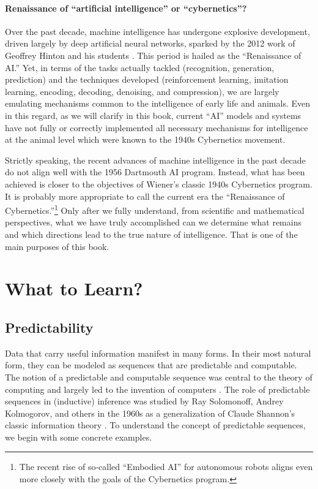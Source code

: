 \documentclass[../../book-main.tex]{subfiles}
\begin{document}
\paragraph{Renaissance of ``artificial intelligence'' or ``cybernetics''?}
Over the past decade, machine intelligence has undergone explosive development, driven largely by deep artificial neural networks, sparked by the 2012 work of Geoffrey Hinton and his students \cite{krizhevsky2012imagenet}. This period is hailed as the ``Renaissance of AI.'' Yet, in terms of the tasks actually tackled (recognition, generation, prediction) and the techniques developed (reinforcement learning, imitation learning, encoding, decoding, denoising, and compression), we are largely emulating mechanisms common to the intelligence of early life and animals. Even in this regard, as we will clarify in this book, current ``AI'' models and systems have not fully or correctly implemented all necessary mechanisms for intelligence at the animal level which were known to the 1940s Cybernetics movement.

Strictly speaking, the recent advances of machine intelligence in the past decade do not align well with the 1956 Dartmouth AI program. Instead, what has been achieved is closer to the objectives of Wiener's classic 1940s Cybernetics program. It is probably more appropriate to call the current era the ``Renaissance of Cybernetics.''\footnote{The recent rise of so-called ``Embodied AI'' for autonomous robots aligns even more closely with the goals of the Cybernetics program.} Only after we fully understand, from scientific and mathematical perspectives, what we have truly accomplished can we determine what remains and which directions lead to the true nature of intelligence. That is one of the main purposes of this book.


\section{What to Learn?}
\label{sec:what-to-learn}

\subsection{Predictability}
\label{sec:predictability}
Data that carry useful information manifest in many forms. In their most natural form, they can be modeled as sequences that are predictable and computable. The notion of a predictable and computable sequence was central to the theory of computing and largely led to the invention of computers \cite{Turing-1936}. The role of predictable sequences in (inductive) inference was studied by Ray Solomonoff, Andrey Kolmogorov, and others in the 1960s \cite{Kolmogorov1998OnTO} as a generalization of Claude Shannon's classic information theory \cite{Shannon-1948}. To understand the concept of predictable sequences, we begin with some concrete examples.
\end{document}
